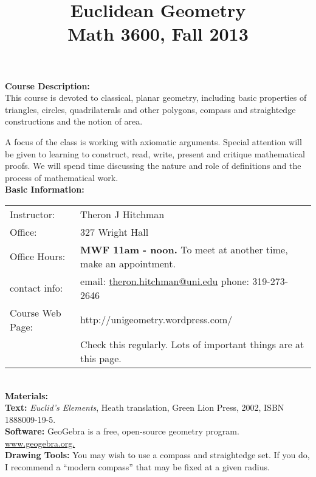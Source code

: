 \documentclass[12pt]{amsart}
\begin{document}
\title{Euclidean Geometry\\ Math 3600, Fall 2013}

\maketitle

\thispagestyle{empty}

\noindent
\textbf{Course Description:}\\
This course is devoted to classical, planar geometry, including basic properties of triangles, circles, quadrilaterals and other polygons, compass and straightedge constructions and the notion of area. 

A focus of the class is working with axiomatic arguments. Special attention will be given to learning to construct, read, write, present and critique mathematical proofs. 
We will spend time discussing the nature and role of definitions and the process of mathematical work.\\[.1in]

\noindent
\textbf{Basic Information:}\\
\begin{tabular}{ll}
Instructor:  & Theron J Hitchman \\
Office: & 327 Wright Hall\\
Office Hours: & \textbf{MWF 11am - noon.}  To meet at another time, make an appointment. \\
contact info: & email:  \url{theron.hitchman@uni.edu} \phantom{wide}  phone: 319-273-2646 \\
Course Web Page: & http://unigeometry.wordpress.com/   \\
 \phantom{wide} & Check this regularly. 
 Lots of important things are at this page. \\
\end{tabular}
{\ }\\[.1in]

\noindent
\textbf{Materials:}\\
\textbf{Text:} 
\emph{Euclid’s Elements}, Heath translation, Green Lion Press, 2002,  ISBN 1888009-19-5. \\
\textbf{Software:} 
GeoGebra is a free, open-source geometry program. \url{www.geogebra.org.}\\ 
\textbf{Drawing Tools:} 
You may wish to use a compass and straightedge set. 
If you do, I recommend a “modern compass” that may be fixed at a given radius.\\[.1in]
\end{document}
